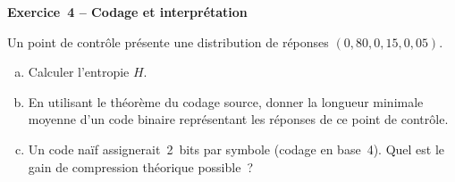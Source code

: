 \begin{boxexo}
\textbf{Exercice~4 – Codage et interprétation}

Un point de contrôle présente une distribution de réponses $(0{,}80, 0{,}15, 0{,}05)$.

\begin{enumerate}[(a)]
  \item Calculer l'entropie $H$.
  \item En utilisant le théorème du codage source, donner la longueur minimale
        moyenne d'un code binaire représentant les réponses de ce point de
        contrôle.
  \item Un code naïf assignerait~2~bits par symbole (codage en base~4). Quel
        est le gain de compression théorique possible~?
\end{enumerate}
\end{boxexo}
